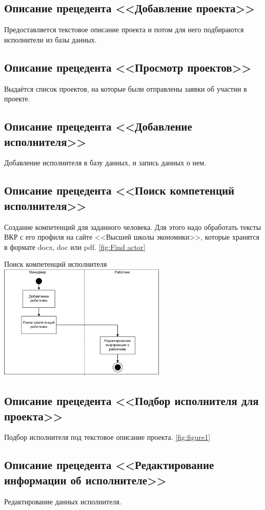 \documentclass[PI,KR]{HSEUniversity}
\begin{document}
\subsection{Описание прецедента <<Добавление проекта>>}
Предоставляется текстовое описание проекта и потом для него подбираются исполнители из базы данных.
\subsection{Описание прецедента <<Просмотр проектов>>}
Выдаётся список проектов, на которые были отправлены заявки об участии в проекте.
\subsection{Описание прецедента <<Добавление исполнителя>>}
Добавление исполнителя в базу данных, и запись данных о нем.
\subsection{Описание прецедента <<Поиск компетенций исполнителя>>}
Создание компетенций для заданного человека. Для этого надо обработать тексты ВКР с его профиля на сайте <<Высшей школы экономики>>, которые хранятся в формате docx, doc или pdf. \ref{fig:Find actor}
\begin{FIGURE}[h]{Поиск компетенций исполнителя \label{fig:Find actor}}
	\includegraphics[width=0.6\textwidth]{img/Диаграмма Бизнес-процесса 2}
\end{FIGURE}
\subsection{Описание прецедента <<Подбор исполнителя для проекта>>}
Подбор исполнителя под текстовое описание проекта. \ref{fig:figure1}
\subsection{Описание прецедента <<Редактирование информации об исполнителе>>}
Редактирование данных исполнителя.
\end{document}
